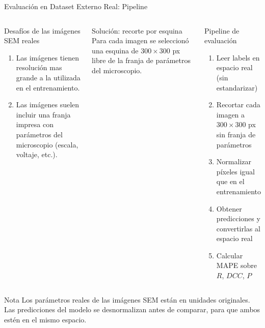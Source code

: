 \documentclass[aspectratio=169, 10pt]{beamer}
\begin{document}
\begin{frame}{Evaluación en Dataset Externo Real: Pipeline}
    \begin{columns}[T]

        \begin{alertblock}{Desafíos de las imágenes SEM reales}
            \begin{enumerate}
                \item Las imágenes tienen resolución mas grande a la utilizada en el entrenamiento.
                \item Las imágenes suelen incluir una franja impresa con parámetros del microscopio (escala, voltaje, etc.).
            \end{enumerate}
        \end{alertblock}

        \begin{block}{Solución: recorte por esquina}
            Para cada imagen se seleccionó una esquina de $300\times300$ px libre de la franja de parámetros del microscopio.
        \end{block}


        \begin{exampleblock}{Pipeline de evaluación}
            \small
            \begin{enumerate}
                \item Leer labels en espacio real (sin estandarizar)
                \item Recortar cada imagen a $300\times300$ px sin franja de parámetros
                \item Normalizar píxeles igual que en el entrenamiento
                \item Obtener predicciones y convertirlas al espacio real
                \item Calcular MAPE sobre $R$, $DCC$, $P$
            \end{enumerate}
        \end{exampleblock}



    \end{columns}

    \begin{block}{Nota}
        Los parámetros reales de las imágenes SEM están en unidades originales. Las predicciones del modelo se desnormalizan antes de comparar, para que ambos estén en el mismo espacio.
    \end{block}

\end{frame}
\end{document}
